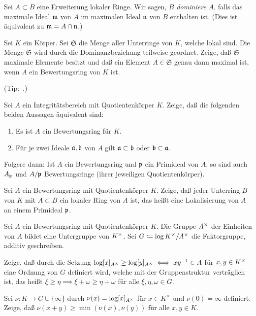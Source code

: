 \begin{exercise}
	Sei \(A \subset B\) eine Erweiterung lokaler Ringe. Wir sagen, \emph{\(B\)
	dominiere \(A\)}, falls das maximale Ideal \(\mathfrak{m}\) von \(A\) im
	maximalen Ideal \(\mathfrak{n}\) von \(B\) enthalten ist. (Dies ist äquivalent
	zu \(\mathfrak{m} = A \cap \mathfrak{n}\).)
	
	Sei \(K\) ein Körper. Sei \(\mathfrak S\) die Menge aller Unterringe von
	\(K\), welche lokal sind. Die Menge \(\mathfrak S\) wird durch die
	Dominanzbeziehung teilweise geordnet. Zeige, daß \(\mathfrak S\) maximale
	Elemente besitzt und daß ein Element \(A \in \mathfrak S\) genau dann
	maximal ist, wenn \(A\) ein Bewertungsring von \(K\) ist.
	
	(Tip:~.)
\end{exercise}

\begin{exercise}
	Sei \(A\) ein Integritätsbereich mit Quotientenkörper \(K\). Zeige, daß
	die folgenden beiden Aussagen äquivalent sind:
	\begin{enumerate}
	\item
		Es ist \(A\) ein Bewertungsring für \(K\).
	\item
		Für je zwei Ideale \(\mathfrak{a}, \mathfrak{b}\) von \(A\) gilt
		\(\mathfrak{a} \subset \mathfrak{b}\) oder \(\mathfrak{b} \subset \mathfrak{a}\).
	\end{enumerate}
	
	Folgere dann: Ist \(A\) ein Bewertungsring und \(\mathfrak{p}\) ein Primideal
	von \(A\), so sind auch \(A_{\mathfrak{p}}\) und \(A/\mathfrak{p}\) Bewertungsringe
	(ihrer jeweiligen Quotientenkörper).
\end{exercise}

\begin{exercise}
	Sei \(A\) ein Bewertungsring mit Quotientenkörper \(K\). Zeige, daß jeder
	Unterring \(B\) von \(K\) mit \(A \subset B\) ein lokaler Ring von \(A\)
	ist, das heißt eine Lokalisierung von \(A\) an einem Primideal \(\mathfrak{p}\).
\end{exercise}

\begin{exercise}
	Sei \(A\) ein Bewertungsring mit Quotientenkörper \(K\). Die Gruppe
	\(A^\times\) der Einheiten von \(A\) bildet eine Untergruppe von
	\(K^\times\). Sei \(G \coloneqq \log K^\times/A^\times\) die Faktorgruppe,
	additiv geschreiben.
	
	Zeige, daß durch die Setzung \(\log [x]_{A^\times} \ge
	\log [y]_{A^\times} \iff xy^{-1} \in A\) für \(x, y \in K^\times\) eine
	Ordnung von \(G\) definiert wird, welche mit der Gruppenstruktur
	verträglich ist, das heißt \(\xi \ge \eta \implies \xi + \omega \ge
	\eta + \omega\) für alle \(\xi, \eta, \omega \in G\).
	
	Sei \(\nu\colon K \to G \cup \{\infty\}\) durch \(\nu(x) = \log [x]_{A^\times}\)
	für \(x \in K^\times\) und \(\nu(0) = \infty\) definiert. Zeige, daß
	\(\nu(x + y) \ge \min(\nu(x), \nu(y))\) für alle \(x, y \in K\).
\end{exercise}

